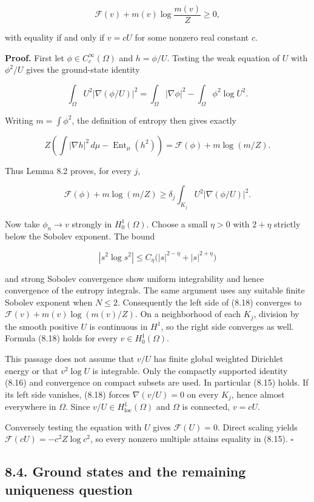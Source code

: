 \documentclass[11pt]{article}
\begin{document}
\[\mathcal F(v)+m(v)\log\frac{m(v)}Z\geq0,\tag{8.15}\]

with equality if and only if \(v=cU\) for some nonzero real constant
\(c\).

\textbf{Proof.} First let \(\phi\in C_c^\infty(\Omega)\) and
\(h=\phi/U\). Testing the weak equation of \(U\) with \(\phi^2/U\) gives
the ground-state identity

\[\int_\Omega U^2|\nabla(\phi/U)|^2
=\int_\Omega|\nabla\phi|^2-\int_\Omega\phi^2\log U^2.\tag{8.16}\]

Writing \(m=\int\phi^2\), the definition of entropy then gives exactly

\[Z\left(\int|\nabla h|^2\,d\mu-\operatorname{Ent}_\mu(h^2)\right)
=\mathcal F(\phi)+m\log(m/Z).\tag{8.17}\]

Thus Lemma 8.2 proves, for every \(j\),

\[\mathcal F(\phi)+m\log(m/Z)
\geq\delta_j\int_{K_j}U^2|\nabla(\phi/U)|^2.\tag{8.18}\]

Now take \(\phi_n\to v\) strongly in \(H^1_0(\Omega)\). Choose a small
\(\eta>0\) with \(2+\eta\) strictly below the Sobolev exponent. The
bound

\[|s^2\log s^2|\leq C_\eta\bigl(|s|^{2-\eta}+|s|^{2+\eta}\bigr)\]

and strong Sobolev convergence show uniform integrability and hence
convergence of the entropy integrals. The same argument uses any
suitable finite Sobolev exponent when \(N\leq2\). Consequently the left
side of (8.18) converges to \(\mathcal F(v)+m(v)\log(m(v)/Z)\). On a
neighborhood of each \(K_j\), division by the smooth positive \(U\) is
continuous in \(H^1\), so the right side converges as well. Formula
(8.18) holds for every \(v\in H^1_0(\Omega)\).

This passage does not assume that \(v/U\) has finite global weighted
Dirichlet energy or that \(v^2\log U\) is integrable. Only the compactly
supported identity (8.16) and convergence on compact subsets are used.
In particular (8.15) holds. If its left side vanishes, (8.18) forces
\(\nabla(v/U)=0\) on every \(K_j\), hence almost everywhere in
\(\Omega\). Since \(v/U\in H^1_{\mathrm{loc}}(\Omega)\) and \(\Omega\)
is connected, \(v=cU\).

Conversely testing the equation with \(U\) gives \(\mathcal F(U)=0\).
Direct scaling yields \(\mathcal F(cU)=-c^2Z\log c^2\), so every nonzero
multiple attains equality in (8.15). \(\square\)

\subsection{8.4. Ground states and the remaining uniqueness
question}\label{ground-states-and-the-remaining-uniqueness-question}
\end{document}

